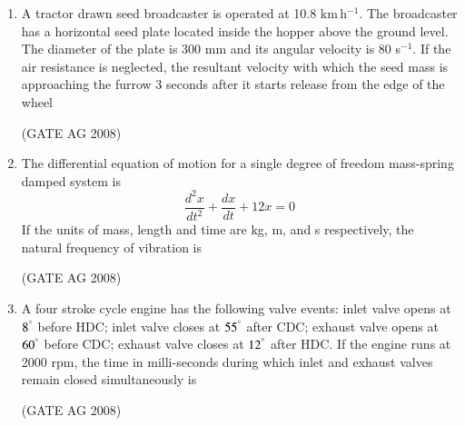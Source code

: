 \documentclass[journal]{IEEEtran}
\begin{document}
\begin{enumerate}
\medskip

\item 
 A tractor drawn seed broadcaster is operated at 10.8 km\,h$^{-1}$. The broadcaster has a horizontal seed plate located inside the hopper above the ground level. The diameter of the plate is 300 mm and its angular velocity is 80 s$^{-1}$. If the air resistance is neglected, the resultant velocity with which the seed mass is approaching the furrow 3 seconds after it starts release from the edge of the wheel
\begin{enumerate}
\end{enumerate}
\hfill(GATE AG 2008)\\

\medskip

\item 
 The differential equation of motion for a single degree of freedom mass-spring damped system is
\[
\frac{d^2 x}{dt^2} + \frac{d x}{dt} + 12 x = 0
\]
If the units of mass, length and time are kg, m, and s respectively, the natural frequency of vibration is
\begin{enumerate}
\end{enumerate}
\hfill(GATE AG 2008)\\

\medskip

\item 
 A four stroke cycle engine has the following valve events: inlet valve opens at $8^ \degree$ before HDC; inlet valve closes at $55^ \degree$ after CDC; exhaust valve opens at $60^ \degree$ before CDC; exhaust valve closes at $12^ \degree$ after HDC. If the engine runs at 2000 rpm, the time in milli-seconds during which inlet and exhaust valves remain closed simultaneously is
\begin{enumerate}
\end{enumerate}
\hfill(GATE AG 2008)\\


\end{enumerate}
\end{document}
